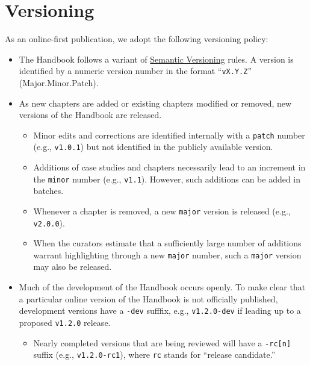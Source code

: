 \documentclass[
]{book}
\providecommand{\tightlist}{%
  \setlength{\itemsep}{0pt}\setlength{\parskip}{0pt}}
\begin{document}
\hypertarget{versioning}{%
\section*{Versioning}\label{versioning}}

As an online-first publication, we adopt the following versioning policy:

\begin{itemize}
\tightlist
\item
  The Handbook follows a variant of \href{https://semver.org/}{Semantic Versioning} rules. A version is identified by a numeric version number in the format ``\texttt{vX.Y.Z}'' (Major.Minor.Patch).
\item
  As new chapters are added or existing chapters modified or removed, new versions of the Handbook are released.

  \begin{itemize}
  \tightlist
  \item
    Minor edits and corrections are identified internally with a \texttt{patch} number (e.g., \texttt{v1.0.1}) but not identified in the publicly available version.
  \item
    Additions of case studies and chapters necessarily lead to an increment in the \texttt{minor} number (e.g., \texttt{v1.1}). However, such additions can be added in batches.
  \item
    Whenever a chapter is removed, a new \texttt{major} version is released (e.g., \texttt{v2.0.0}).
  \item
    When the curators estimate that a sufficiently large number of additions warrant highlighting through a new \texttt{major} number, such a \texttt{major} version may also be released.
  \end{itemize}
\item
  Much of the development of the Handbook occurs openly. To make clear that a particular online version of the Handbook is not officially published, development versions have a \texttt{-dev} sufffix, e.g., \texttt{v1.2.0-dev} if leading up to a proposed \texttt{v1.2.0} release.

  \begin{itemize}
  \tightlist
  \item
    Nearly completed versions that are being reviewed will have a \texttt{-rc{[}n{]}} suffix (e.g., \texttt{v1.2.0-rc1}), where \texttt{rc} stands for ``release candidate.''
  \end{itemize}
\end{itemize}
\end{document}
